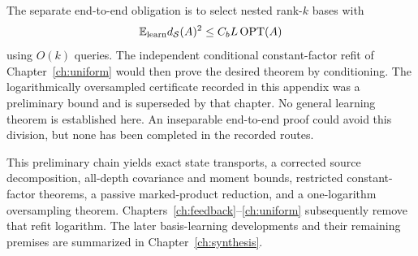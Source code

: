 \documentclass[11pt,oneside,openany,a4paper]{book}
\numberwithin{equation}{chapter}
\theoremstyle{definition}
\theoremstyle{remark}
\newcommand{\proofstep}[1]{\par\addvspace{.45\baselineskip}\Needspace{3\baselineskip}\textbf{#1}\par\nobreak}
\newcommand{\R}{\mathbb R}\newcommand{\E}{\mathbb E}\newcommand{\Prb}{\mathbb P}\newcommand{\PP}{\mathbb P}
\newcommand{\T}{\mathsf T}\newcommand{\Id}{I}
\newcommand{\F}[1]{\left\lVert#1\right\rVert_F}
\newcommand{\N}[1]{\left\lVert#1\right\rVert}
\newcommand{\op}[1]{\left\lVert#1\right\rVert_{\rm op}}
\newcommand{\ip}[2]{\left\langle#1,#2\right\rangle_F}
\DeclareMathOperator{\tr}{tr}\DeclareMathOperator{\rank}{rank}
\DeclareMathOperator{\diag}{blockdiag}\DeclareMathOperator{\range}{range}
\DeclareMathOperator{\HSS}{HSS}\DeclareMathOperator{\dist}{dist}
\DeclareMathOperator{\Var}{Var}\DeclareMathOperator{\supp}{supp}
\newcommand{\UC}{\mathcal U}\newcommand{\VC}{\mathcal V}\newcommand{\err}{\mathcal E}
\newcommand{\Sn}[2]{\left\lVert#1\right\rVert_{S_{#2}}}
\newcommand{\Cov}{\mathsf C}\newcommand{\Loss}{\mathsf L}\newcommand{\Fil}{\mathcal F}
\DeclareMathOperator{\diver}{div}\DeclareMathOperator{\vecop}{vec}\DeclareMathOperator{\Gammafun}{Gamma}
\begin{document}
The separate end-to-end obligation is to select nested rank-$k$ bases with
\[
 \E_{\rm learn}d_{\mathcal S}(A)^2\le C_bL\OPT(A)
\]
using $O(k)$ queries. The independent conditional constant-factor refit of Chapter~\ref{ch:uniform} would then prove the desired theorem by conditioning. The logarithmically oversampled certificate recorded in this appendix was a preliminary bound and is superseded by that chapter. No general learning theorem is established here. An inseparable end-to-end proof could avoid this division, but none has been completed in the recorded routes.

This preliminary chain yields exact state transports, a corrected source decomposition, all-depth covariance and moment bounds, restricted constant-factor theorems, a passive marked-product reduction, and a one-logarithm oversampling theorem. Chapters~\ref{ch:feedback}--\ref{ch:uniform} subsequently remove that refit logarithm. The later basis-learning developments and their remaining premises are summarized in Chapter~\ref{ch:synthesis}.




\endgroup

\begingroup
\let\R\relax
\newcommand{\R}{\mathbb R}
\let\E\relax
\newcommand{\E}{\mathbb E}
\let\Prb\relax
\newcommand{\Prb}{\mathbb P}
\let\T\relax
\newcommand{\T}{\mathsf T}
\let\F\relax
\newcommand{\F}[1]{\left\lVert#1\right\rVert_{F}}
\let\N\relax
\newcommand{\N}[1]{\left\lVert#1\right\rVert}
\let\ip\relax
\newcommand{\ip}[2]{\left\langle#1,#2\right\rangle_F}
\let\tr\relax
\newcommand{\tr}{\operatorname{tr}}
\let\rank\relax
\newcommand{\rank}{\operatorname{rank}}
\let\diag\relax
\newcommand{\diag}{\operatorname{blockdiag}}
\let\range\relax
\newcommand{\range}{\operatorname{range}}
\let\OPT\relax
\newcommand{\OPT}{\operatorname{OPT}}
\let\HSS\relax
\newcommand{\HSS}{\operatorname{HSS}}
\let\diver\relax
\newcommand{\diver}{\operatorname{div}}
\let\Var\relax
\newcommand{\Var}{\operatorname{Var}}
\let\UC\relax
\newcommand{\UC}{\mathcal U}
\let\VC\relax
\newcommand{\VC}{\mathcal V}
\let\err\relax
\newcommand{\err}{\mathcal E}
\let\proofstep\relax
\newcommand{\proofstep}[1]{\par\addvspace{.45\baselineskip}\Needspace{3\baselineskip}\textbf{#1}\par\nobreak}
\let\op\relax
\newcommand{\op}[1]{\left\lVert#1\right\rVert_{\mathrm{op}}}
\let\Sn\relax
\newcommand{\Sn}[2]{\left\lVert#1\right\rVert_{S_{#2}}}
\let\Cov\relax
\newcommand{\Cov}{\mathsf C}
\let\Loss\relax
\newcommand{\Loss}{\mathsf L}
\let\Fil\relax
\newcommand{\Fil}{\mathcal F}
\let\Id\relax
\newcommand{\Id}{I}
\let\supp\relax
\newcommand{\supp}{\operatorname{supp}}
\let\vecop\relax
\newcommand{\vecop}{\operatorname{vec}}
\let\Gammafun\relax
\newcommand{\Gammafun}{\operatorname{Gamma}}
\end{document}
